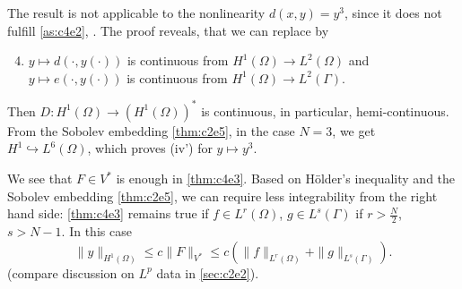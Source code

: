 \documentclass[../skript.tex]{subfiles}
\begin{document}
\begin{remark} %
\label{rem:c4e5}
The result is not applicable to the nonlinearity $d(x, y) = y^3$, since it does not fulfill \cref{as:c4e2}, . The proof reveals, that we can replace  by
\begin{enumerate}[(i')]
\setcounter{enumi}{3}
\item $y \mapsto d(\cdot, y(\cdot))$ is continuous from $H^1(\Omega) \to L^2(\Omega)$ and $y \mapsto e(\cdot, y(\cdot))$ is continuous from $H^1(\Omega) \to L^2(\Gamma)$.
\end{enumerate}
Then $D : H^1(\Omega) \to \left( H^1(\Omega) \right)^*$ is continuous, in particular, hemi-continuous.
From the Sobolev embedding \cref{thm:c2e5}, in the case $N = 3$, we get $H^1 \hookrightarrow L^6(\Omega)$, which proves (iv') for $y \mapsto y^3$.
\end{remark}
\begin{remark} %
\label{rem:c4e6}
We see that $F \in V^*$ is enough in \cref{thm:c4e3}. Based on Hölder's inequality and the Sobolev embedding \cref{thm:c2e5}, we can require less integrability from the right hand side: \cref{thm:c4e3} remains true if $f \in L^r(\Omega)$, $g \in L^s(\Gamma)$ if $r > \frac{N}{2}$, $s > N -1$. In this case
\[
	\| y \|_{H^1(\Omega)} \leq c \| F \|_{V^*} \leq c \left( \| f \|_{L^r(\Omega)} + \| g \|_{L^s(\Gamma)} \right).
\]
(compare discussion on $L^p$ data in \cref{sec:c2e2}).
\end{remark}
\end{document}

